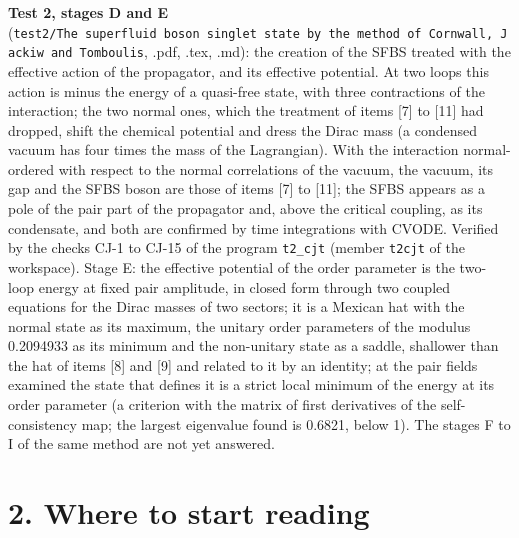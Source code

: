 \documentclass[
  10pt,
]{article}
\begin{document}
\textbf{Test 2, stages D and E}
(\texttt{test2/The\ superfluid\ boson\ singlet\ state\ by\ the\ method\ of\ Cornwall,\ Jackiw\ and\ Tomboulis},
.pdf, .tex, .md): the creation of the SFBS treated with the effective
action of the propagator, and its effective potential. At two loops this
action is minus the energy of a quasi-free state, with three
contractions of the interaction; the two normal ones, which the
treatment of items {[}7{]} to {[}11{]} had dropped, shift the chemical
potential and dress the Dirac mass (a condensed vacuum has four times
the mass of the Lagrangian). With the interaction normal-ordered with
respect to the normal correlations of the vacuum, the vacuum, its gap
and the SFBS boson are those of items {[}7{]} to {[}11{]}; the SFBS
appears as a pole of the pair part of the propagator and, above the
critical coupling, as its condensate, and both are confirmed by time
integrations with CVODE. Verified by the checks CJ-1 to CJ-15 of the
program \texttt{t2\_cjt} (member \texttt{t2cjt} of the workspace). Stage
E: the effective potential of the order parameter is the two-loop energy
at fixed pair amplitude, in closed form through two coupled equations
for the Dirac masses of two sectors; it is a Mexican hat with the normal
state as its maximum, the unitary order parameters of the modulus
0.2094933 as its minimum and the non-unitary state as a saddle,
shallower than the hat of items {[}8{]} and {[}9{]} and related to it by
an identity; at the pair fields examined the state that defines it is a
strict local minimum of the energy at its order parameter (a criterion
with the matrix of first derivatives of the self-consistency map; the
largest eigenvalue found is 0.6821, below 1). The stages F to I of the
same method are not yet answered.

\hypertarget{where-to-start-reading}{%
\section{2. Where to start reading}\label{where-to-start-reading}}
\end{document}
